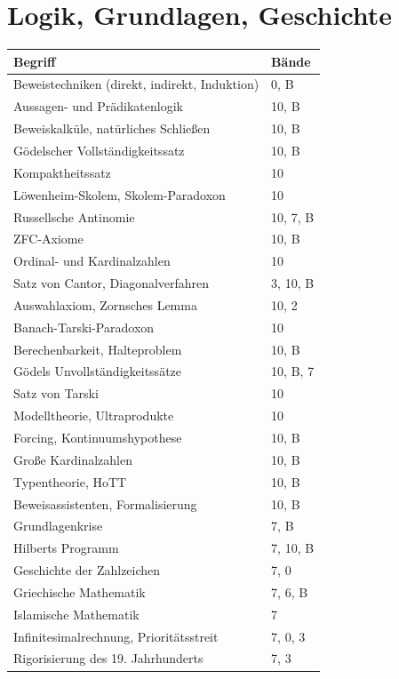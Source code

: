 \section*{Logik, Grundlagen, Geschichte}
\nopagebreak
{\small\renewcommand{\arraystretch}{1.32}
\begin{longtable}{@{}P{5.6cm}P{2.8cm}@{}}
\toprule
\textbf{Begriff} & \textbf{Bände}\\
\midrule
\endhead
Beweistechniken (direkt, indirekt, Induktion) & 0, B\\
Aussagen- und Prädikatenlogik & 10, B\\
Beweiskalküle, natürliches Schließen & 10, B\\
Gödelscher Vollständigkeitssatz & 10, B\\
Kompaktheitssatz & 10\\
Löwenheim-Skolem, Skolem-Paradoxon & 10\\
Russellsche Antinomie & 10, 7, B\\
ZFC-Axiome & 10, B\\
Ordinal- und Kardinalzahlen & 10\\
Satz von Cantor, Diagonalverfahren & 3, 10, B\\
Auswahlaxiom, Zornsches Lemma & 10, 2\\
Banach-Tarski-Paradoxon & 10\\
Berechenbarkeit, Halteproblem & 10, B\\
Gödels Unvollständigkeitssätze & 10, B, 7\\
Satz von Tarski & 10\\
Modelltheorie, Ultraprodukte & 10\\
Forcing, Kontinuumshypothese & 10, B\\
Große Kardinalzahlen & 10, B\\
Typentheorie, HoTT & 10, B\\
Beweisassistenten, Formalisierung & 10, B\\
Grundlagenkrise & 7, B\\
Hilberts Programm & 7, 10, B\\
Geschichte der Zahlzeichen & 7, 0\\
Griechische Mathematik & 7, 6, B\\
Islamische Mathematik & 7\\
Infinitesimalrechnung, Prioritätsstreit & 7, 0, 3\\
Rigorisierung des 19. Jahrhunderts & 7, 3\\
\bottomrule
\end{longtable}}

